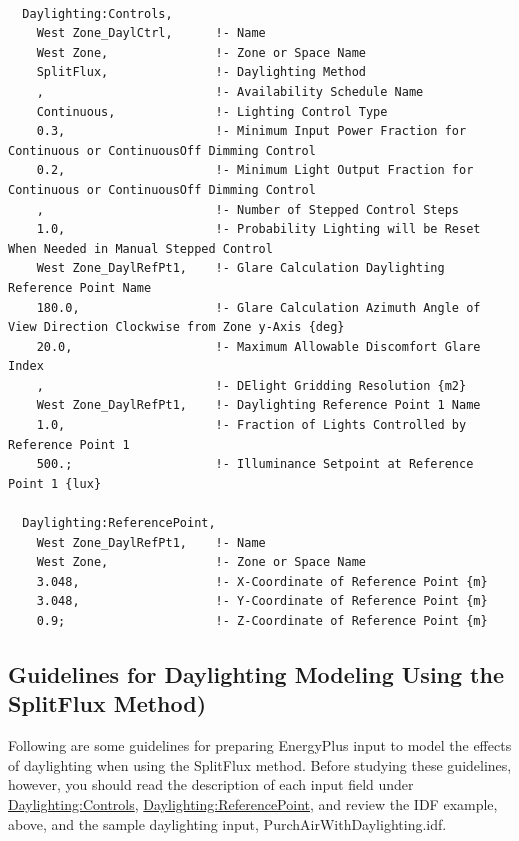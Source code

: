 \begin{lstlisting}

  Daylighting:Controls,
    West Zone_DaylCtrl,      !- Name
    West Zone,               !- Zone or Space Name
    SplitFlux,               !- Daylighting Method
    ,                        !- Availability Schedule Name
    Continuous,              !- Lighting Control Type
    0.3,                     !- Minimum Input Power Fraction for Continuous or ContinuousOff Dimming Control
    0.2,                     !- Minimum Light Output Fraction for Continuous or ContinuousOff Dimming Control
    ,                        !- Number of Stepped Control Steps
    1.0,                     !- Probability Lighting will be Reset When Needed in Manual Stepped Control
    West Zone_DaylRefPt1,    !- Glare Calculation Daylighting Reference Point Name
    180.0,                   !- Glare Calculation Azimuth Angle of View Direction Clockwise from Zone y-Axis {deg}
    20.0,                    !- Maximum Allowable Discomfort Glare Index
    ,                        !- DElight Gridding Resolution {m2}
    West Zone_DaylRefPt1,    !- Daylighting Reference Point 1 Name
    1.0,                     !- Fraction of Lights Controlled by Reference Point 1
    500.;                    !- Illuminance Setpoint at Reference Point 1 {lux}

  Daylighting:ReferencePoint,
    West Zone_DaylRefPt1,    !- Name
    West Zone,               !- Zone or Space Name
    3.048,                   !- X-Coordinate of Reference Point {m}
    3.048,                   !- Y-Coordinate of Reference Point {m}
    0.9;                     !- Z-Coordinate of Reference Point {m}

\end{lstlisting}

\subsection{Guidelines for Daylighting Modeling Using the SplitFlux Method)}\label{guidelines-for-daylighting-modeling-splitflux-method}

Following are some guidelines for preparing EnergyPlus input to model the effects of daylighting when using the SplitFlux method. Before studying these guidelines, however, you should read the description of each input field under \hyperref[daylightingcontrols-000]{Daylighting:Controls}, \hyperref[daylightingreferencepoint-000]{Daylighting:ReferencePoint}, and review the IDF example, above, and the sample daylighting input, PurchAirWithDaylighting.idf.

